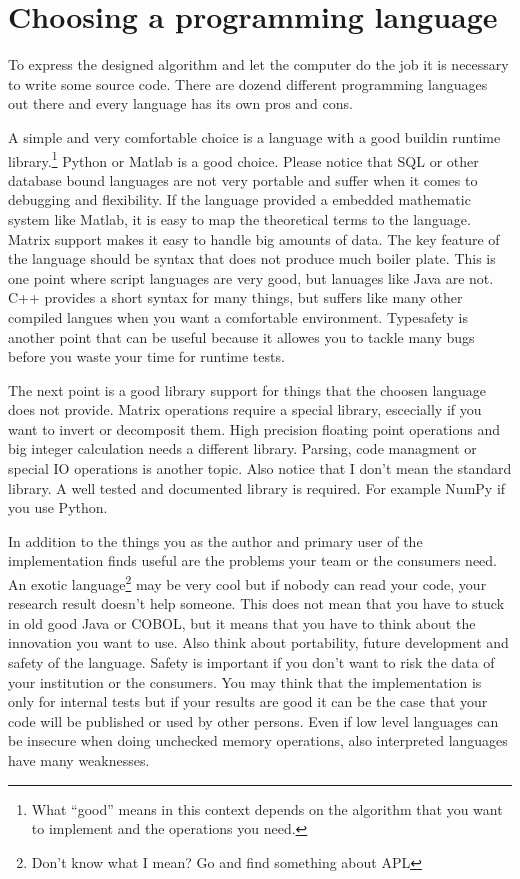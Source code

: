 \documentclass[%
	fontsize=11pt,%
	paper=a4,%
	pagesize,%
	twoside=false,%
	listof=totoc,%
	draft%
]{scrbook}
\begin{document}
\section{Choosing a programming language}
To express the designed algorithm and let the computer do the job it is necessary to write some source code. There are dozend different programming languages out there and every language has its own pros and cons.

A simple and very comfortable choice is a language with a good buildin runtime library.\footnote{What ``good'' means in this context depends on the algorithm that you want to implement and the operations you need.} Python or Matlab is a good choice. Please notice that SQL or other database bound languages are not very portable and suffer when it comes to debugging and flexibility. If the language provided a embedded mathematic system like Matlab, it is easy to map the theoretical terms to the language. Matrix support makes it easy to handle big amounts of data. The key feature of the language should be syntax that does not produce much boiler plate. This is one point where script languages are very good, but lanuages like Java are not. C++ provides a short syntax for many things, but suffers like many other compiled langues when you want a comfortable environment. Typesafety is another point that can be useful because it allowes you to tackle many bugs before you waste your time for runtime tests.

The next point is a good library support for things that the choosen language does not provide. Matrix operations require a special library, escecially if you want to invert or decomposit them. High precision floating point operations and big integer calculation needs a different library. Parsing, code managment or special IO operations is another topic. Also notice that I don't mean the standard library. A well tested and documented library is required. For example NumPy if you use Python.

In addition to the things you as the author and primary user of the implementation finds useful are the problems your team or the consumers need. An exotic language\footnote{Don't know what I mean? Go and find something about APL} may be very cool but if nobody can read your code, your research result doesn't help someone. This does not mean that you have to stuck in old good Java or COBOL, but it means that you have to think about the innovation you want to use. Also think about portability, future development and safety of the language. Safety is important if you don't want to risk the data of your institution or the consumers. You may think that the implementation is only for internal tests but if your results are good it can be the case that your code will be published or used by other persons. Even if low level languages can be insecure when doing unchecked memory operations, also interpreted languages have many weaknesses.
\end{document}
